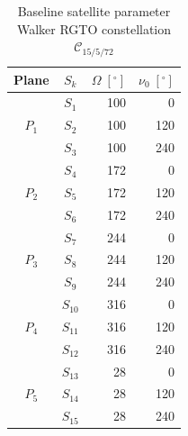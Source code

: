 \begin{table}[H]
\centering
\caption{\footnotesize{Baseline satellite parameter Walker RGTO constellation $\mathcal{C}_{15/5/72}$}}
\label{tab:walker_c15}
\smallskip
\footnotesize
\setlength{\tabcolsep}{4pt}
\begin{tabular}{c c r r}
\toprule
Plane & $S_k$ & $\Omega\;[^{\circ}]$ & $\nu_0\;[^{\circ}]$ \\
\midrule
\multirow{3}{*}{$P_1$} & $S_1$  & 100 &   0 \\
                        & $S_2$  & 100 & 120 \\
                        & $S_3$  & 100 & 240 \\
\midrule
\multirow{3}{*}{$P_2$} & $S_4$  & 172 &   0 \\
                        & $S_5$  & 172 & 120 \\
                        & $S_6$  & 172 & 240 \\
\midrule
\multirow{3}{*}{$P_3$} & $S_7$  & 244 &   0 \\
                        & $S_8$  & 244 & 120 \\
                        & $S_9$  & 244 & 240 \\
\midrule
\multirow{3}{*}{$P_4$} & $S_{10}$ & 316 &   0 \\
                        & $S_{11}$ & 316 & 120 \\
                        & $S_{12}$ & 316 & 240 \\
\midrule
\multirow{3}{*}{$P_5$} & $S_{13}$ &  28 &   0 \\
                        & $S_{14}$ &  28 & 120 \\
                        & $S_{15}$ &  28 & 240 \\
\bottomrule
\end{tabular}
\end{table}
